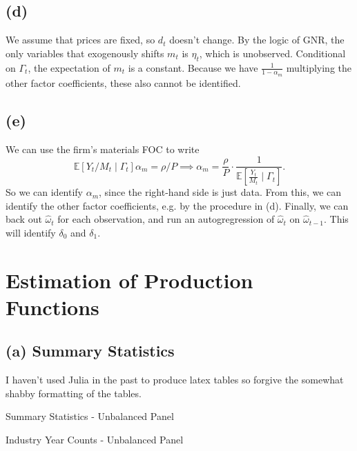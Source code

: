 \documentclass[11pt]{article}
\begin{document}
\subsection*{(d)}
We assume that prices are fixed, so $d_t$ doesn't change. By the logic of GNR, the only variables that exogenously shifts $m_t$ is $\eta_t$, which is unobserved. Conditional on $\Gamma_t$, the expectation of $m_t$ is a constant. Because we have $\frac{1}{1 - \alpha_m}$ multiplying the other factor coefficients, these also cannot be identified. 

\subsection*{(e)}
We can use the firm's materials FOC to write
\[\mathbb{E}[Y_t / M_t \mid \Gamma_t] \alpha_m = \rho / P \implies \alpha_m = \frac{\rho}{P} \cdot \frac{1}{ \mathbb{E}\left[ \frac{Y_t}{M_t} \mid \Gamma_t\right] } .\]
So we can identify $\alpha_m$, since the right-hand side is just data. From this, we can identify the other factor coefficients, e.g. by the procedure in (d). Finally, we can back out $\hat{\omega}_t$ for each observation, and run an autogregression of $\hat{\omega}_t$ on $\hat{\omega}_{t-1}$. This will identify $\delta_0$ and $\delta_1$. 

\section{Estimation of Production Functions}

\subsection*{(a) Summary Statistics}

I haven't used Julia in the past to produce latex tables so forgive the somewhat shabby formatting of the tables. 

\begin{table}[ht]
    \centering
    \setlength{\tabcolsep}{4pt} %
\renewcommand{\arraystretch}{1.2}
    
    \caption{Summary Statistics - Unbalanced Panel}
    \label{tab:summary_statistics1}
\end{table}

\begin{table}[ht]
    \centering
    \setlength{\tabcolsep}{2pt} %
\renewcommand{\arraystretch}{1.2}
    
    \caption{Industry Year Counts - Unbalanced Panel}
    \label{tab:ind_year1}
\end{table}
\end{document}
